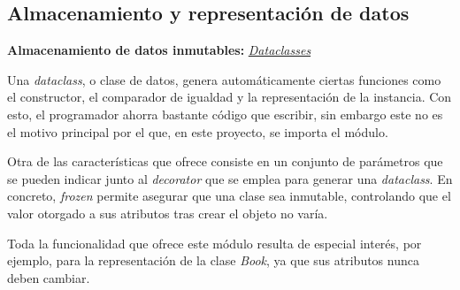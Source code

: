 \subsection{Almacenamiento y representación de datos}

\textbf{Almacenamiento de datos inmutables:} \href{https://docs.python.org/3/library/dataclasses.html}{\textit{Dataclasses}}

Una \textit{dataclass}, o clase de datos, genera automáticamente ciertas funciones como el constructor, el comparador de igualdad y la representación de la instancia. Con esto, el programador ahorra bastante código que escribir, sin embargo este no es el motivo principal por el que, en este proyecto, se importa el módulo.

Otra de las características que ofrece consiste en un conjunto de parámetros que se pueden indicar junto al \textit{decorator} que se emplea para generar una \textit{dataclass}. En concreto, \textit{frozen} permite asegurar que una clase sea inmutable, controlando que el valor otorgado a sus atributos tras crear el objeto no varía.

Toda la funcionalidad que ofrece este módulo resulta de especial interés, por ejemplo, para la representación de la clase \textit{Book}, ya que sus atributos nunca deben cambiar.
